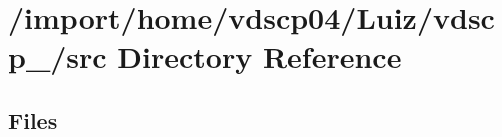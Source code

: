 \section{/import/home/vdscp04/\+Luiz/vdscp\+\_/src Directory Reference}
\label{dir_68267d1309a1af8e8297ef4c3efbcdba}
\subsection*{Files}
\begin{DoxyCompactItemize}
\end{DoxyCompactItemize}
